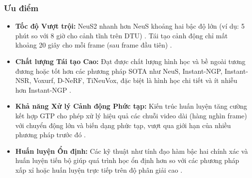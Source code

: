 \subsubsection{Ưu điểm}
\begin{itemize}
    \item \textbf{Tốc độ Vượt trội:} NeuS2 nhanh hơn NeuS khoảng hai bậc độ lớn (ví dụ: 5 phút so với 8 giờ cho cảnh tĩnh trên DTU) \cite{Wang2023NeuS2_source_3, Wang2023NeuS2_source_10, Wang2023NeuS2_source_50, Wang2023NeuS2_source_157}. Tái tạo cảnh động chỉ mất khoảng 20 giây cho mỗi frame (sau frame đầu tiên) \cite{Wang2023NeuS2_source_11, Wang2023NeuS2_source_21, Wang2023NeuS2_source_197, Wang2023NeuS2_source_208}.
    \item \textbf{Chất lượng Tái tạo Cao:} Đạt được chất lượng hình học và bề ngoài tương đương hoặc tốt hơn các phương pháp SOTA như NeuS, Instant-NGP, Instant-NSR, Voxurf, D-NeRF, TiNeuVox, đặc biệt là hình học chi tiết và ít nhiễu hơn Instant-NGP \cite{Wang2023NeuS2_source_3, Wang2023NeuS2_source_7, Wang2023NeuS2_source_9, Wang2023NeuS2_source_20, Wang2023NeuS2_source_53, Wang2023NeuS2_source_173, Wang2023NeuS2_source_181, Wang2023NeuS2_source_190, Wang2023NeuS2_source_194, Wang2023NeuS2_source_199, Wang2023NeuS2_source_209}.
    \item \textbf{Khả năng Xử lý Cảnh động Phức tạp:} Kiến trúc huấn luyện tăng cường kết hợp GTP cho phép xử lý hiệu quả các chuỗi video dài (hàng nghìn frame) với chuyển động lớn và biến dạng phức tạp, vượt qua giới hạn của nhiều phương pháp trước đó \cite{Wang2023NeuS2_source_6, Wang2023NeuS2_source_27, Wang2023NeuS2_source_34, Wang2023NeuS2_source_60, Wang2023NeuS2_source_62, Wang2023NeuS2_source_104, Wang2023NeuS2_source_152, Wang2023NeuS2_source_183, Wang2023NeuS2_source_195, Wang2023NeuS2_source_204, Wang2023NeuS2_source_205}.
    \item \textbf{Huấn luyện Ổn định:} Các kỹ thuật như tính đạo hàm bậc hai chính xác và huấn luyện tiến bộ giúp quá trình học ổn định hơn so với các phương pháp xấp xỉ hoặc huấn luyện trực tiếp trên độ phân giải cao \cite{Wang2023NeuS2_source_5, Wang2023NeuS2_source_100, Wang2023NeuS2_source_133, Wang2023NeuS2_source_178}.
\end{itemize}

